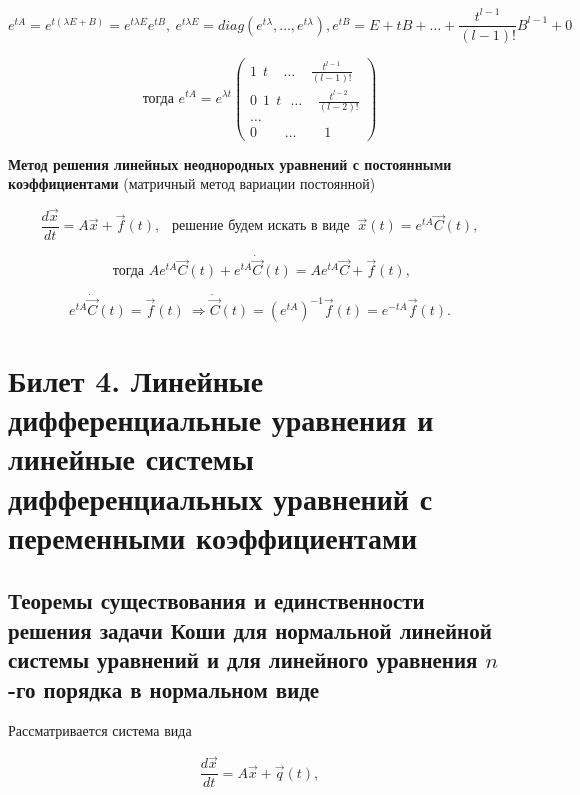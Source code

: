 \[ e^{tA} = e^{t(\lambda E + B)} = e^{t\lambda E}e^{tB},\ e^{t\lambda E} = diag(e^{t\lambda}, \dots, e^{t\lambda}), e^{tB} = E + tB + \dots + \frac{t^{l-1}}{(l-1)!}B^{l-1} + 0 \]

\begin{equation*}
	\text{тогда } e^{tA} = e^{\lambda t}
 	\begin{pmatrix}
            1\ \ t\ \ \ \ \  \dots\ \ \ \ \ \frac{t^{l-1}}{(l-1)!} \\
            0\ \ 1\ \ t\ \ \ \dots\ \ \ \ \  \frac{t^{l-2}}{(l-2)!} \\
            \dots \\
            0\ \ \ \ \ \ \ \ \ \dots\ \ \ \ \ \ \ \ \  1
    \end{pmatrix}
\end{equation*}

\textbf{Метод решения линейных неоднородных уравнений с постоянными коэффициентами} (матричный метод вариации постоянной)

\[ \frac{d\overrightarrow{x}}{dt} = A\overrightarrow{x} + \overrightarrow{f}(t),\ \ \text{ решение будем искать в виде } \ \overrightarrow{x}(t) = e^{tA}\overrightarrow{C}(t), \]

\[ \text{ тогда } Ae^{tA}\overrightarrow{C}(t) + e^{tA}\dot{\overrightarrow{C}}(t) = Ae^{tA}\overrightarrow{C} + \overrightarrow{f}(t),\]

\[ e^{tA}\dot{\overrightarrow{C}}(t) = \overrightarrow{f}(t)\ \Rightarrow \dot{\overrightarrow{C}}(t) = (e^{tA})^{-1}\overrightarrow{f}(t) = e^{-tA}\overrightarrow{f}(t). \]

\newpage

\section{Билет 4. Линейные дифференциальные уравнения и линейные системы дифференциальных уравнений с переменными коэффициентами}

\subsection{Теоремы существования и единственности решения задачи Коши для нормальной линейной системы уравнений и
для линейного уравнения $n$-го порядка в нормальном виде}

Рассматривается система вида 

\begin{equation}
	\frac{d\overrightarrow{x}}{dt} = A\overrightarrow{x} + \overrightarrow{q}(t),
	\label{Issue5_2}
\end{equation} 

